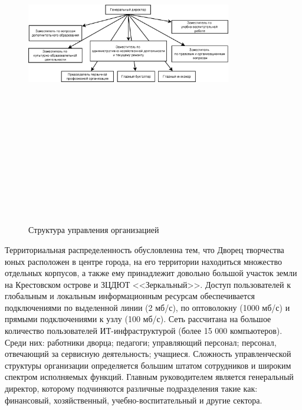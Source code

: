 \documentclass[utf8,usehyperref,12pt]{G7-32}
\begin{document}
\begin{figure}[ht]
   \centering%
   \includegraphics[height=160mm, width=0.8\textwidth, clip, keepaspectratio]{pictures/management_structure}
   \caption{Структура управления организацией}\label{fig:fig_management_struct}
 \end{figure}

Территориальная распределенность обусловленна тем, что Дворец творчества юных расположен в центре города, на его территории находиться множество отдельных корпусов, а также ему принадлежит довольно большой участок земли на Крестовском острове и ЗЦДЮТ <<Зеркальный>>. Доступ пользователей к глобальным и локальным информационным ресурсам обеспечивается подключениями по выделенной линии
(2 мб/с), по оптоволокну (1000 мб/с) и прямыми подключениями к узлу (100 мб/с). Сеть рассчитана на большое количество пользователей ИТ-инфраструктурой (более
15 000 компьютеров). Среди них: работники дворца; педагоги; управляющий персонал;  персонал, отвечающий за сервисную деятельность; учащиеся. Сложность управленческой структуры организации определяется большим штатом сотрудников и широким спектром исполняемых функций. Главным руководителем является генеральный директор, которому подчиняются различные подразделения такие как: финансовый, хозяйственный, учебно-воспитательный и другие сектора.
\end{document}
